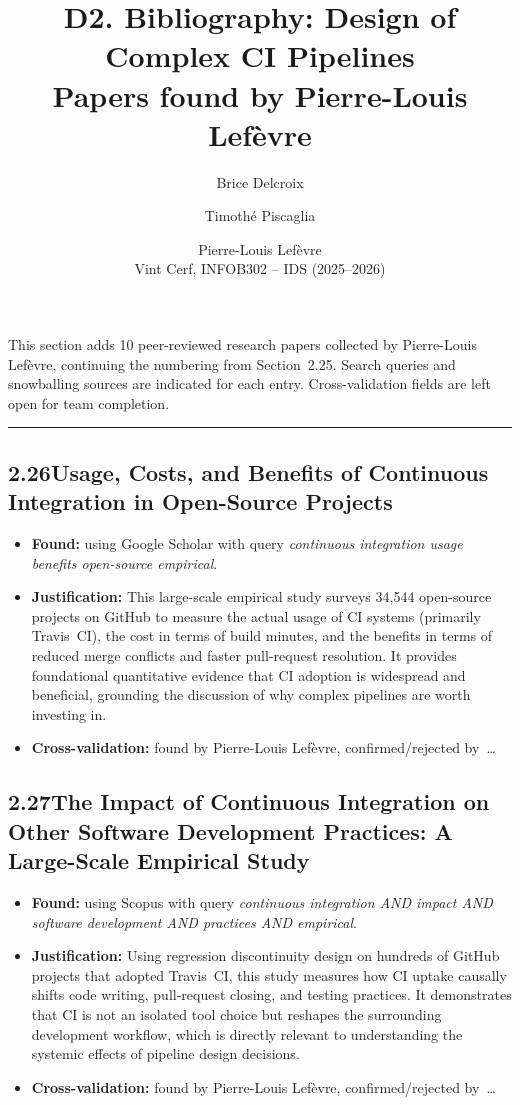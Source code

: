 \documentclass[a4paper,11pt]{article}
\title{\textbf{D2. Bibliography: Design of Complex CI Pipelines}\\[0.4em]
\large Papers found by Pierre-Louis Lef\`evre}
\author{Brice Delcroix \and Timoth\'e Piscaglia \and Pierre-Louis Lef\`evre\\[0.3em]
\small Vint Cerf, INFOB302 -- IDS (2025--2026)}
\date{}
\begin{document}
\maketitle

\noindent This section adds 10 peer-reviewed research papers collected by Pierre-Louis Lef\`evre,
continuing the numbering from Section~2.25. Search queries and snowballing sources are
indicated for each entry. Cross-validation fields are left open for team completion.

\bigskip
\hrule
\bigskip

\subsection*{2.26\quad Usage, Costs, and Benefits of Continuous Integration in Open-Source Projects~\cite{hilton2016usage}}

\begin{itemize}[leftmargin=1.5em]
  \item \textbf{Found:} using Google Scholar with query \textit{continuous integration usage benefits open-source empirical}.
  \item \textbf{Justification:} This large-scale empirical study surveys 34,544 open-source projects on GitHub to measure the actual usage of CI systems (primarily Travis~CI), the cost in terms of build minutes, and the benefits in terms of reduced merge conflicts and faster pull-request resolution. It provides foundational quantitative evidence that CI adoption is widespread and beneficial, grounding the discussion of why complex pipelines are worth investing in.
  \item \textbf{Cross-validation:} found by Pierre-Louis Lef\`evre, confirmed/rejected by~\ldots
\end{itemize}

\subsection*{2.27\quad The Impact of Continuous Integration on Other Software Development Practices: A Large-Scale Empirical Study~\cite{zhao2017impact}}

\begin{itemize}[leftmargin=1.5em]
  \item \textbf{Found:} using Scopus with query \textit{continuous integration AND impact AND software development AND practices AND empirical}.
  \item \textbf{Justification:} Using regression discontinuity design on hundreds of GitHub projects that adopted Travis~CI, this study measures how CI uptake causally shifts code writing, pull-request closing, and testing practices. It demonstrates that CI is not an isolated tool choice but reshapes the surrounding development workflow, which is directly relevant to understanding the systemic effects of pipeline design decisions.
  \item \textbf{Cross-validation:} found by Pierre-Louis Lef\`evre, confirmed/rejected by~\ldots
\end{itemize}
\end{document}
